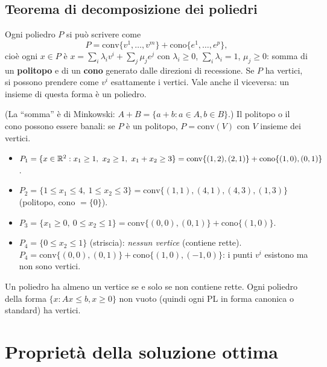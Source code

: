 \subsection{Teorema di decomposizione dei poliedri}
\begin{prop}
Ogni poliedro $P$ si può scrivere come
\[ P=\mathrm{conv}\{v^1,\dots,v^m\}+\mathrm{cono}\{e^1,\dots,e^p\}, \]
cioè ogni $x\in P$ è $x=\sum_{i}\lambda_iv^i+\sum_j\mu_je^j$ con $\lambda_i\ge0$, $\sum_i\lambda_i=1$, $\mu_j\ge0$: somma di un \textbf{politopo} e di un \textbf{cono} generato dalle direzioni di recessione. Se $P$ ha vertici, si possono prendere come $v^i$ esattamente i vertici. Vale anche il viceversa: un insieme di questa forma è un poliedro.
\end{prop}
(La ``somma'' è di Minkowski: $A+B=\{a+b: a\in A, b\in B\}$.) Il politopo o il cono possono essere banali: se $P$ è un politopo, $P=\mathrm{conv}(V)$ con $V$ insieme dei vertici.

\begin{esbox}
\begin{itemize}[nosep]
\item $P_1=\{x\in\R^2: x_1\ge1,\ x_2\ge1,\ x_1+x_2\ge3\}=\mathrm{conv}\{(1,2),(2,1)\}+\mathrm{cono}\{(1,0),(0,1)\}$.
\item $P_2=\{1\le x_1\le4,\ 1\le x_2\le3\}=\mathrm{conv}\{(1,1),(4,1),(4,3),(1,3)\}$ (politopo, cono $=\{0\}$).
\item $P_3=\{x_1\ge0,\ 0\le x_2\le1\}=\mathrm{conv}\{(0,0),(0,1)\}+\mathrm{cono}\{(1,0)\}$.
\item $P_4=\{0\le x_2\le1\}$ (striscia): \emph{nessun vertice} (contiene rette). $P_4=\mathrm{conv}\{(0,0),(0,1)\}+\mathrm{cono}\{(1,0),(-1,0)\}$: i punti $v^i$ esistono ma non sono vertici.
\end{itemize}
\end{esbox}
Un poliedro ha almeno un vertice se e solo se non contiene rette. Ogni poliedro della forma $\{x: Ax\le b, x\ge0\}$ non vuoto (quindi ogni PL in forma canonica o standard) ha vertici.

\section{Proprietà della soluzione ottima}

